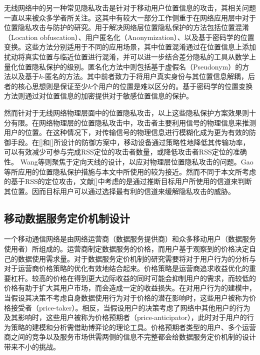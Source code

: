 无线网络中的另一种常见隐私攻击是针对于移动用户位置信息的攻击，其相关问题一直以来被众多学者所关注。这其中有较大一部分工作侧重于在网络应用层中对于位置隐私攻击与防护的研究。用于解决网络层位置隐私保护的方法包括位置混淆（Location obfuscation）\cite{Agrawal:Privacy}、用户匿名化（Anonymization）\cite{Beresford:Mix, Gongjournal, Shin:AnonySense}、以及基于密码学的位置变换\cite{Ghinita:Private, Khoshgozaran:Blind}。这些方法分别适用于不同的应用场景，其中位置混淆通过在位置信息上添加扰动将真实位置与临近位置进行混淆，并可以进一步结合差分隐私的工具从数学上量化位置隐私保护的级别\cite{Dwork:Differential}。匿名化方法中则包括基于虚假名（Pseudonym）的方法\cite{Beresford:Mix}以及基于$k$-匿名的方法\cite{Shin:AnonySense}。其中前者致力于将用户真实身份与其位置信息解耦，后者的核心思想则是保证至少$k$个用户的位置是难以区分的。基于密码学的位置变换方法则通过对位置信息的加密提供对于敏感位置信息的保护。

然而针对于无线网络物理层面中的位置隐私攻击，以上这些隐私保护方案效果则十分有限。在网络物理层的位置隐私攻击中，攻击者主要利用信号的物理信息来推测用户的位置。在这种情况下，对传输信号的物理信息进行模糊化成为更为有效的防御手段。在[]和[]所设计的防御方案中，移动设备通过策略性地降低其传输功率，可以有效减少可参与完成RSS定位的攻击者数量，或降低攻击者RSS定位的准确性。 Wang等\cite{Ting11}则聚焦于定向天线的设计，以应对物理层位置隐私攻击的问题。Gao等\cite{location}所应用的位置隐私保护措施与本文中所使用的较为接近。然而不同于本文所考虑的基于RSS的定位攻击，文献[]中考虑的是通过推断目标用户所使用的信道来判断其位置。因而目标用户可以通过选择最有利的信道来缓解隐私攻击的威胁。


\subsection{移动数据服务定价机制设计}

一个移动通信网络是由网络运营商（数据服务提供商）和众多移动用户（数据服务使用者）所组成的。运营商制定数据服务的价格，而用户基于观察到的价格决定自己的数据使用需求量。对于数据服务定价机制的研究需要将对于用户行为的分析与对于运营商价格策略的优化有效地结合起来。价格策略是运营商追求收益优化的重要杠杆。较高的价格在得到更大边际收益的同时可能会抑制用户的需求，而较低的价格有助于扩大其用户市场，而会造成一定的收益损失。在对用户行为的建模中，当假设其决策不考虑自身数据使用行为对于价格的潜在影响时，这些用户被称为价格接受者（price-taker）。相反，当假设用户的决策考虑了网络中其他用户的行为及其影响时，这些用户被称为价格预期者（price-anticipator），此时对于用户的行为策略的建模和分析需借助博弈论的理论工具。价格预期者类型的用户、多个运营商之间的竞争以及服务市场供需两侧的信息不完整都会给数据服务定价机制的设计带来不小的挑战。

